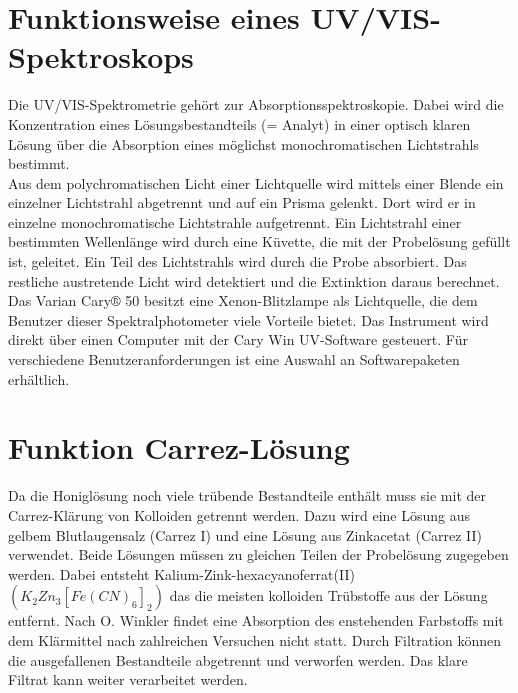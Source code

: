 \section{Funktionsweise eines UV/VIS-Spektroskops}
Die UV/VIS-Spektrometrie gehört zur Absorptionsspektroskopie. Dabei wird die Konzentration
eines Lösungsbestandteils (= Analyt) in einer optisch klaren Lösung über die Absorption
eines möglichst monochromatischen Lichtstrahls bestimmt.\\
Aus dem polychromatischen Licht einer Lichtquelle wird mittels einer Blende ein einzelner
Lichtstrahl abgetrennt und auf ein Prisma gelenkt. Dort wird er in einzelne monochromatische
Lichtstrahle aufgetrennt. Ein Lichtstrahl einer bestimmten Wellenlänge wird
durch eine Küvette, die mit der Probelösung gefüllt ist, geleitet. Ein Teil des Lichtstrahls wird
durch die Probe absorbiert. Das restliche austretende Licht wird detektiert und die Extinktion
daraus berechnet.
Das Varian Cary® 50 besitzt eine Xenon-Blitzlampe als Lichtquelle, die dem Benutzer dieser
Spektralphotometer viele Vorteile bietet. Das Instrument wird direkt über einen Computer mit
der Cary Win UV-Software gesteuert. Für verschiedene Benutzeranforderungen ist eine Auswahl
an Softwarepaketen erhältlich.


\section{Funktion Carrez-Lösung}
Da die Honiglösung noch viele trübende Bestandteile enthält muss sie mit der Carrez-Klärung von Kolloiden getrennt werden. Dazu wird eine Lösung aus gelbem Blutlaugensalz (Carrez I) und eine Lösung aus Zinkacetat (Carrez II) verwendet. Beide Lösungen müssen zu gleichen Teilen der Probelösung zugegeben werden. Dabei entsteht Kalium-Zink-hexacyanoferrat(II) $(K_{2}Zn_{3}[Fe(CN)_{6}]_{2})$ das die meisten kolloiden Trübstoffe aus der Lösung entfernt. Nach O. Winkler findet eine Absorption des enstehenden Farbstoffs mit dem Klärmittel nach zahlreichen Versuchen nicht statt. Durch Filtration können die ausgefallenen Bestandteile abgetrennt und verworfen werden. Das klare Filtrat kann weiter verarbeitet werden.~\cite{Winkler} %

